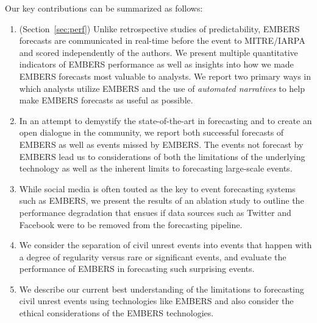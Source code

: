 Our key contributions can be summarized as follows:
\begin{enumerate}
\setlength\itemsep{0pt}
\itemsep0em
\item (Section~\ref{sec:perf})
  Unlike retrospective studies of predictability, EMBERS forecasts are communicated in real-time before the
event to MITRE/IARPA and scored independently of the authors.
We present multiple quantitative indicators of EMBERS performance
as well as insights into how
we made EMBERS forecasts most valuable to analysts. We report two primary
ways in which analysts utilize EMBERS and the use of {\it automated
narratives} to help make EMBERS forecasts as useful as possible.

\item
In an attempt to demystify the state-of-the-art
in forecasting and to create an open dialogue in the community, we report both successful
forecasts of EMBERS as well as events missed by EMBERS. The events not forecast by EMBERS lead us to
considerations of both the limitations of the underlying technology as well as
the inherent limits to forecasting large-scale events.
\item
While social media is often touted as the key to event forecasting
systems such as EMBERS, we present the results of an ablation study to outline
the performance degradation that ensues if data sources
such as Twitter and Facebook were to be removed from the forecasting pipeline.
\item
We consider the separation of civil unrest events into events
that happen with a degree of regularity versus rare
or significant
events, and evaluate the performance of EMBERS in forecasting such
surprising events.
\item
We describe our current best understanding of the limitations to
forecasting civil unrest events using technologies like EMBERS and
also consider the ethical considerations of the EMBERS technologies.
\end{enumerate}

